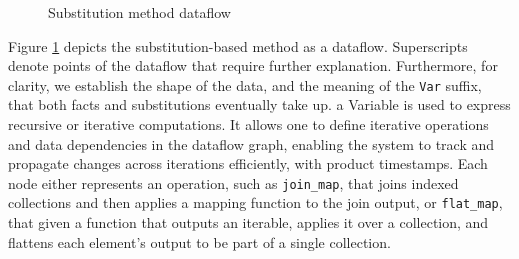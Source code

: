 \documentclass[sigconf,screen,review=false,natbib]{acmart}
\theoremstyle{definition}
\begin{document}
\begin{figure}[htb!]
	\caption{Substitution method dataflow}
	\label{fig:substitution_simple_ddflow}
\end{figure}
Figure \ref{fig:substitution_simple_ddflow} depicts the substitution-based method as a dataflow. Superscripts denote
points of the dataflow that require further explanation. Furthermore, for clarity, we establish the shape of the
data, and the meaning of the \verb|Var| suffix, that both facts and substitutions eventually take up. a Variable is used
to express recursive or iterative computations. It allows one to define iterative operations and data dependencies in
the dataflow graph, enabling the system to track and propagate changes across iterations efficiently, with product
timestamps. Each node either represents an operation, such as \verb|join_map|, that joins indexed collections and
then applies a mapping function to the join output, or \verb|flat_map|, that given a function that outputs an iterable, applies it over a collection, and flattens each element's output to be part of a single collection.
\end{document}
